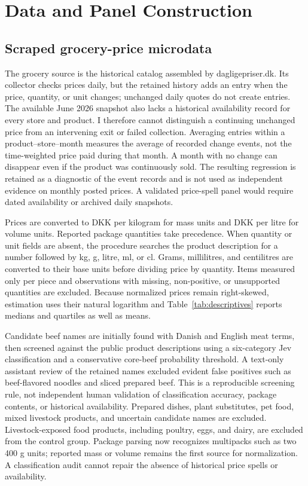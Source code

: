 \documentclass[11pt]{article}
\begin{document}
\section{Data and Panel Construction}\label{sec:data}
\subsection{Scraped grocery-price microdata}
The grocery source is the historical catalog assembled by dagligepriser.dk. Its collector checks prices daily, but the retained history adds an entry when the price, quantity, or unit changes; unchanged daily quotes do not create entries. The available June 2026 snapshot also lacks a historical availability record for every store and product. I therefore cannot distinguish a continuing unchanged price from an intervening exit or failed collection. Averaging entries within a product--store--month measures the average of recorded change events, not the time-weighted price paid during that month. A month with no change can disappear even if the product was continuously sold. The resulting regression is retained as a diagnostic of the event records and is not used as independent evidence on monthly posted prices. A validated price-spell panel would require dated availability or archived daily snapshots.

Prices are converted to DKK per kilogram for mass units and DKK per litre for volume units. Reported package quantities take precedence. When quantity or unit fields are absent, the procedure searches the product description for a number followed by kg, g, litre, ml, or cl. Grams, millilitres, and centilitres are converted to their base units before dividing price by quantity. Items measured only per piece and observations with missing, non-positive, or unsupported quantities are excluded. Because normalized prices remain right-skewed, estimation uses their natural logarithm and Table~\ref{tab:descriptives} reports medians and quartiles as well as means.

Candidate beef names are initially found with Danish and English meat terms, then screened against the public product descriptions using a six-category Jev classification and a conservative core-beef probability threshold. A text-only assistant review of the retained names excluded evident false positives such as beef-flavored noodles and sliced prepared beef. This is a reproducible screening rule, not independent human validation of classification accuracy, package contents, or historical availability. Prepared dishes, plant substitutes, pet food, mixed livestock products, and uncertain candidate names are excluded. Livestock-exposed food products, including poultry, eggs, and dairy, are excluded from the control group. Package parsing now recognizes multipacks such as two 400 g units; reported mass or volume remains the first source for normalization. A classification audit cannot repair the absence of historical price spells or availability.
\end{document}
